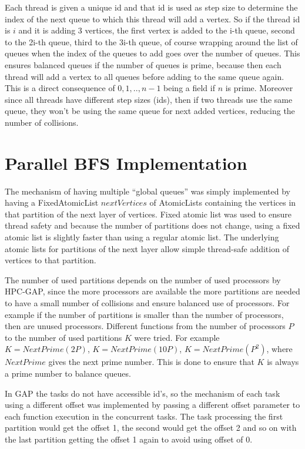 \documentclass{report}
\theoremstyle{plain}
\theoremstyle{definition}
\theoremstyle{remark}
\begin{document}
Each thread is given a unique id and that id is used as step size to determine the index of the next queue to which this thread will add a vertex. So if the thread id is $i$ and it is adding 3 vertices, the first vertex is added to the i-th queue, second to the 2i-th queue, third to the 3i-th queue, of course wrapping around the list of queues when the index of the queues to add goes over the number of queues. This ensures balanced queues if the number of queues is prime, because then each thread will add a vertex to all queues before adding to the same queue again. This is a direct consequence of ${0, 1,..,n-1}$ being a field if $n$ is prime. Moreover since all threads have different step sizes (ids), then if two threads use the same queue, they won't be using the same queue for next added vertices, reducing the number of collisions.

\section{Parallel BFS Implementation}

The mechanism of having multiple ``global queues'' was simply implemented by having a FixedAtomicList $nextVertices$ of AtomicLists containing the vertices in that partition of the next layer of vertices. Fixed atomic list was used to ensure thread safety and because the number of partitions does not change, using a fixed atomic list is slightly faster than using a regular atomic list. The underlying atomic lists for partitions of the next layer allow simple thread-safe addition of vertices to that partition.

The number of used partitions depends on the number of used processors by HPC-GAP, since the more processors are available the more partitions are needed to have a small number of collisions and ensure balanced use of processors. For example if the number of partitions is smaller than the number of processors, then are unused processors. Different functions from the number of processors $P$ to the number of used partitions $K$ were tried. For example $K=NextPrime(2P)$, $K=NextPrime(10P)$, $K=NextPrime(P^2)$, where $NextPrime$ gives the next prime number. This is done to ensure that $K$ is always a prime number to balance queues.

In GAP the tasks do not have accessible id's, so the mechanism of each task using a different offset was implemented by passing a different offset parameter to each function execution in the concurrent tasks. The task processing the first partition would get the offset 1, the second would get the offset 2 and so on with the last partition getting the offset 1 again to avoid using offset of 0.
\end{document}
